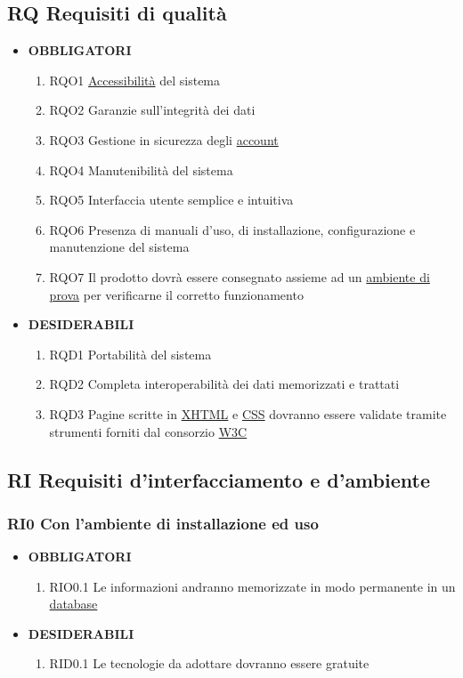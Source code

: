 \documentclass[11pt,a4paper]{article}
\begin{document}
\subsection{RQ Requisiti di qualità}
\begin{itemize}
\item \textbf{OBBLIGATORI}
\begin{enumerate}
\item RQO1 \underline{Accessibilità} del sistema
\item RQO2 Garanzie sull'integrità dei dati
\item RQO3 Gestione in sicurezza degli \underline{account}
\item RQO4 Manutenibilità del sistema
\item RQO5 Interfaccia utente semplice e intuitiva
\item RQO6 Presenza di manuali d'uso, di installazione, configurazione e manutenzione del sistema
\item RQO7 Il prodotto dovrà essere consegnato assieme ad un \underline{ambiente di prova} per verificarne il corretto funzionamento
\end{enumerate}
\item \textbf{DESIDERABILI}
\begin{enumerate}
\item RQD1 Portabilità del sistema
\item RQD2 Completa interoperabilità dei dati memorizzati e trattati
\item RQD3 Pagine scritte in \underline{XHTML} e \underline{CSS} dovranno essere validate tramite strumenti forniti dal consorzio \underline{W3C}
\end{enumerate}
\end{itemize}
\subsection{RI Requisiti d'interfacciamento e d'ambiente}
\subsubsection{RI0 Con l’ambiente di installazione ed uso}
\begin{itemize}
\item \textbf{OBBLIGATORI}
\begin{enumerate}
\item RIO0.1 Le informazioni andranno memorizzate in modo permanente in un \underline{database}
\end{enumerate}
\item \textbf{DESIDERABILI}
\begin{enumerate}
\item RID0.1 Le tecnologie da adottare dovranno essere gratuite
\end{enumerate}
\end{itemize}
\end{document}

